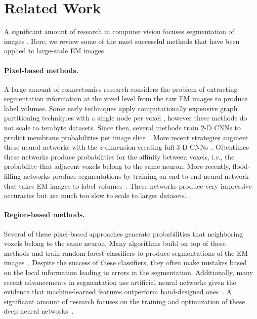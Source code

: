 \section{Related Work}

A significant amount of research in computer vision focuses segmentation of images \cite{zaitoun2015survey}. 
Here, we review some of the most successful methods that have been applied to large-scale EM images.

\paragraph{Pixel-based methods.} 

A large amount of connectomics research considers the problem of extracting segmentation information at the voxel level from the raw EM images to produce label volumes.
Some early techniques apply computationally expensive graph partitioning techniques with a single node per voxel  \cite{andres2012globally}, however these methods do not scale to terabyte datasets.
Since then, several methods train 2-D CNNs to predict membrane probabilities per image slice~\cite{ciresan2012deep,jain2010boundary,kaynig2015large,rhoananet,amelio_segmentation}. 
More recent strategies augment these neural networks with the $z$-dimension creating full 3-D CNNs~\cite{lee2015recursive,ronneberger2015u}.
Oftentimes these networks produce probabilities for the affinity between voxels, i.e., the probability that adjacent voxels belong to the same neuron.
More recently, flood-filling networks produce segmentations by training an end-to-end neural network that takes EM images to label volumes~\cite{januszewski2016flood}.
These networks produce very impressive accuracies but are much too slow to scale to larger datasets.


\paragraph{Region-based methods.} 

Several of these pixel-based approaches generate probabilities that neighboring voxels belong to the same neuron.
Many algorithms build on top of these methods and train random-forest classifiers to produce segmentations of the EM images~\cite{seymour2016rhoananet,nunez2014graph,10.1371/journal.pone.0125825,parag2017anisotropic,zlateski2015image}. 
Despite the success of these classifiers, they often make mistakes based on the local information leading to errors in the segmentation. 
Additionally, many recent advancements in segmentation use artificial neural networks given the evidence that machine-learned features outperform hand-designed ones~\cite{bogovic2013learned}.
A significant amount of research focuses on the training and optimization of these deep neural networks~\cite{chatfield2014return,maas2013rectifier,nesterov1983method}. 


